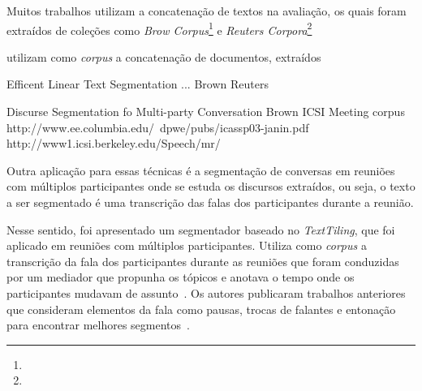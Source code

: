 Muitos trabalhos utilizam a concatenação de textos na avaliação, os quais foram extraídos de coleções como \textit{Brow Corpus}\footnote{\urlbrowcorpus} e \textit{Reuters Corpora}\footnote{\urlreuterscorpus}

utilizam como \textit{corpus} a concatenação de documentos, extraídos 





Efficent Linear Text Segmentation ...
	Brown
	Reuters

Discurse Segmentation fo Multi-party Conversation
	Brown
	ICSI Meeting corpus
		http://www.ee.columbia.edu/~dpwe/pubs/icassp03-janin.pdf
		http://www1.icsi.berkeley.edu/Speech/mr/
		







Outra aplicação para essas técnicas é a segmentação de conversas em reuniões com múltiplos participantes onde se estuda os discursos extraídos, ou seja, o texto a ser segmentado é uma transcrição das falas dos participantes durante a reunião.
%

Nesse sentido, foi apresentado um segmentador baseado no  \textit{TextTiling}, que foi aplicado em reuniões com múltiplos participantes. Utiliza como \textit{corpus} a transcrição da fala dos participantes durante as reuniões que foram conduzidas por um mediador que propunha os tópicos e anotava o tempo onde os participantes mudavam de assunto~\cite{Banerjee2006}. 
Os autores publicaram trabalhos anteriores que consideram elementos da fala como pausas, trocas de falantes e entonação para encontrar melhores segmentos~\cite{Galley2003}.






